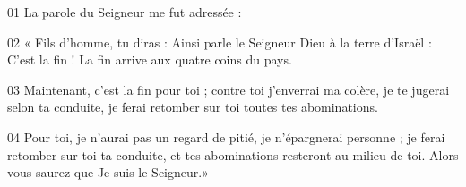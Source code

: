 01 La parole du Seigneur me fut adressée :

02 « Fils d’homme, tu diras : Ainsi parle le Seigneur Dieu à la terre d’Israël : C’est la fin ! La fin arrive aux quatre coins du pays.

03 Maintenant, c’est la fin pour toi ; contre toi j’enverrai ma colère, je te jugerai selon ta conduite, je ferai retomber sur toi toutes tes abominations.

04 Pour toi, je n’aurai pas un regard de pitié, je n’épargnerai personne ; je ferai retomber sur toi ta conduite, et tes abominations resteront au milieu de toi. Alors vous saurez que Je suis le Seigneur.»
